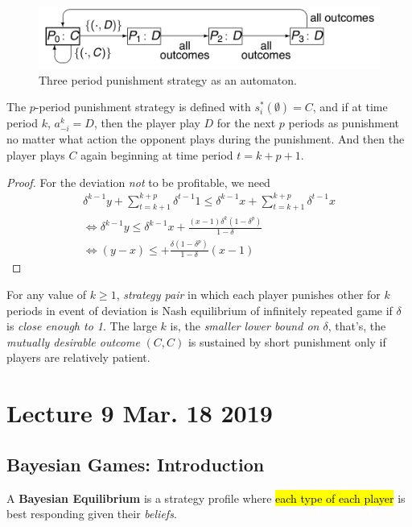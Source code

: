 \documentclass[11pt]{article}
\begin{document}
					\begin{figure}[h]
						\centering
						\includegraphics[width=0.7\linewidth]{fig/3punishment.png}
						\caption{Three period punishment strategy as an automaton.}
					\end{figure}
					\begin{proposition}
						The $p$-period punishment strategy is defined with $s_i^*(\emptyset) = C$, and if at time period $k$, $a_{-i}^k = D$, then the player play $D$ for the next $p$ periods as punishment no matter what action the opponent plays during the punishment. And then the player plays $C$ again beginning at time period $t=k+p+1$.
						\begin{proof}
							For the deviation \emph{not} to be profitable, we need
							\begin{gather}
								\delta^{k-1} y + \sum_{t=k+1}^{k+p} \delta^{t-1} 1 \leq \delta^{k-1} x + \sum_{t=k+1}^{k+p} \delta^{t-1} x \\
								\iff \delta^{k-1} y \leq \delta^{k-1} x + \frac{(x-1)\delta^k (1 - \delta^p)}{1 - \delta} \\
								\iff (y - x)\leq + \frac{\delta(1 - \delta^p)}{1 - \delta}(x - 1)
							\end{gather}
						\end{proof}
					\end{proposition}
					
					\begin{proposition}
						For any value of $k \geq 1$, \emph{strategy pair} in which each player punishes other for $k$ periods in event of deviation is Nash equilibrium of infinitely repeated game if $\delta$ is \emph{close enough to 1}. The large $k$ is, the \emph{smaller lower bound on $\delta$}, that's, the \emph{mutually desirable outcome} $(C,C)$ is sustained by short punishment only if players are relatively patient.
					\end{proposition}
					
	\section{Lecture 9 Mar. 18 2019}
		\subsection{Bayesian Games: Introduction}
			\begin{definition}
				A \textbf{Bayesian Equilibrium} is a strategy profile where \hl{each type of each player} is best responding given their \emph{beliefs}.
			\end{definition}
			
\end{document}
